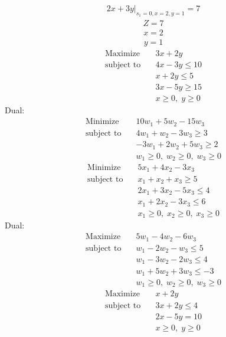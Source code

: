 \documentclass{article}
\begin{document}
\begin{align*}
\left.2x + 3y\right|_{s_{1}=0,x=2,y=1}=7\end{align*}
\begin{align*}
Z=7\end{align*}
\begin{align*}
x=2\end{align*}
\begin{align*}
y=1\end{align*}
\begin{align*}
\text{Maximize} \quad & 3x + 2y\\
\text{subject to} \quad
& 4x - 3y\le10\\
& x + 2y\le5\\
& 3x - 5y\ge15\\
& x\ge0,\; y\ge0\end{align*}
Dual:\\
\begin{align*}
\text{Minimize} \quad & 10w_{1} + 5w_{2} - 15w_{3}\\
\text{subject to} \quad
& 4w_{1} + w_{2} - 3w_{3}\ge3\\
& -3w_{1} + 2w_{2} + 5w_{3}\ge2\\
& w_{1}\ge0,\; w_{2}\ge0,\; w_{3}\ge0\end{align*}
\begin{align*}
\text{Minimize} \quad & 5x_{1} + 4x_{2} - 3x_{3}\\
\text{subject to} \quad
& x_{1} + x_{2} + x_{3}\ge5\\
& 2x_{1} + 3x_{2} - 5x_{3}\le4\\
& x_{1} + 2x_{2} - 3x_{3}\le6\\
& x_{1}\ge0,\; x_{2}\ge0,\; x_{3}\ge0\end{align*}
Dual:\\
\begin{align*}
\text{Maximize} \quad & 5w_{1} - 4w_{2} - 6w_{3}\\
\text{subject to} \quad
& w_{1} - 2w_{2} - w_{3}\le5\\
& w_{1} - 3w_{2} - 2w_{3}\le4\\
& w_{1} + 5w_{2} + 3w_{3}\le-3\\
& w_{1}\ge0,\; w_{2}\ge0,\; w_{3}\ge0\end{align*}
\begin{align*}
\text{Maximize} \quad & x + 2y\\
\text{subject to} \quad
& 3x + 2y\le4\\
& 2x - 5y=10\\
& x\ge0,\; y\ge0\end{align*}
\end{document}
